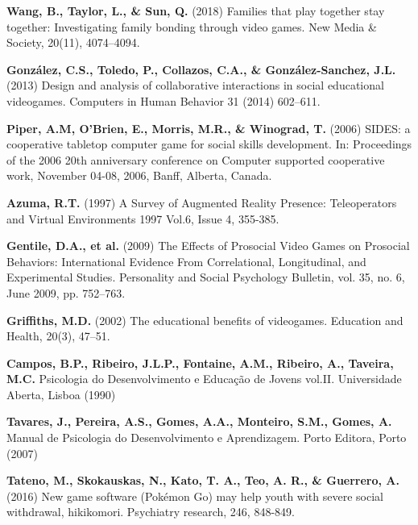 \documentclass[runningheads]{llncs}
\begin{document}
\newpage
%
%
% 
% 
%
\begin{thebibliography}{8}

   \textbf{Wang, B., Taylor, L., \& Sun, Q.} (2018) Families that play together stay together: Investigating family bonding through video games. New Media \& Society, 20(11), 4074–4094. 

 \textbf{González, C.S., Toledo, P., Collazos, C.A., \& González-Sanchez, J.L.} (2013) Design and analysis of collaborative interactions in social educational videogames. Computers in Human Behavior 31 (2014) 602–611. 


 \textbf{Piper, A.M, O'Brien, E., Morris, M.R., \& Winograd, T.} (2006) SIDES: a cooperative tabletop computer game for social skills development. In: Proceedings of the 2006 20th anniversary conference on Computer supported cooperative work, November 04-08, 2006, Banff, Alberta, Canada. 

 \textbf{Azuma, R.T.} (1997) A Survey of Augmented Reality Presence: Teleoperators and Virtual Environments 1997 Vol.6, Issue 4, 355-385. 

 \textbf{Gentile, D.A., et al.} (2009) The Effects of Prosocial Video Games on Prosocial Behaviors: International Evidence From Correlational, Longitudinal, and Experimental Studies. Personality and Social Psychology Bulletin, vol. 35, no. 6, June 2009, pp. 752–763. 

 \textbf{Griffiths, M.D.} (2002) The educational benefits of videogames. Education and Health, 20(3), 47–51.

 \textbf{Campos, B.P., Ribeiro, J.L.P., Fontaine, A.M., Ribeiro, A., Taveira, M.C.} Psicologia do Desenvolvimento e Educação de Jovens vol.II. Universidade Aberta, Lisboa (1990) 

 \textbf{Tavares, J., Pereira, A.S., Gomes, A.A., Monteiro, S.M., Gomes, A.} Manual de Psicologia do Desenvolvimento e Aprendizagem. Porto Editora, Porto (2007)

 	\textbf{Tateno, M., Skokauskas, N., Kato, T. A., Teo, A. R., \& Guerrero, A.} (2016) New game software (Pokémon Go) may help youth with severe social withdrawal, hikikomori. Psychiatry research, 246, 848-849. 


\end{thebibliography}
\end{document}
